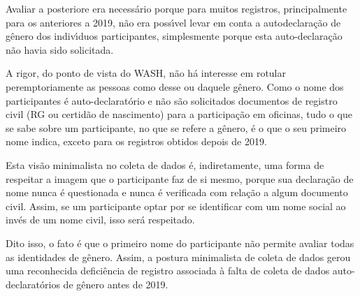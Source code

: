 \documentclass[
12pt,		%
openright,	%
twoside,  %
a4paper,			%
chapter=TITLE,		%
english,			%
french,				%
spanish,			%
brazil				%
]{USPSC-classe/USPSC}
\begin{document}
Avaliar a posteriore era necess\'ario porque para muitos registros, principalmente para os anteriores a 2019, n\~ao era poss\'{\i}vel levar em conta a autodeclara\c{c}\~ao de g\^enero dos indiv\'{\i}duos participantes, simplesmente porque esta auto-declara\c{c}\~ao n\~ao havia sido solicitada.














A rigor, do ponto de vista do WASH, n\~ao h\'a interesse em rotular peremptoriamente as pessoas como desse ou daquele g\^enero. Como o nome dos participantes \'e auto-declarat\'orio e n\~ao s\~ao solicitados documentos de registro civil (RG ou certid\~ao de nascimento) para a participa\c{c}\~ao em oficinas, tudo o que se sabe sobre um participante, no que se refere a g\^enero, \'e o que o seu primeiro nome indica, exceto para os registros obtidos depois de 2019.














Esta vis\~ao minimalista no coleta de dados \'e, indiretamente, uma forma de respeitar a imagem que o participante faz de si mesmo, porque sua declara\c{c}\~ao de nome nunca \'e questionada e nunca \'e verificada com rela\c{c}\~ao a algum documento civil. Assim, se um participante optar por se identificar com um nome social ao inv\'es de um nome civil, isso ser\'a respeitado.














Dito isso, o fato \'e que o primeiro nome do participante n\~ao permite avaliar todas as identidades de g\^enero. Assim, a postura minimalista de coleta de dados gerou uma reconhecida defici\^encia de registro associada \`a falta de coleta de dados auto-declarat\'orios de g\^enero antes de 2019.
\end{document}
